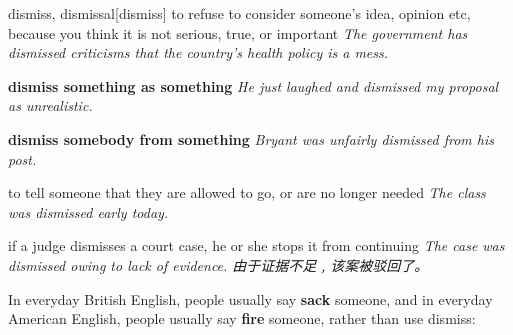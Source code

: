 \begin{DefWord}{dismiss, dismissal}[dismiss]
    to refuse to consider someone’s idea, opinion etc, because you think it is not serious, true, or important
    \textit{The government has dismissed criticisms that the country’s health policy is a mess.}

    \textbf{dismiss something as something}
    \textit{He just laughed and dismissed my proposal as unrealistic.}

    \textbf{dismiss somebody from something}
    \textit{ Bryant was unfairly dismissed from his post.}

    to tell someone that they are allowed to go, or are no longer needed
    \textit{The class was dismissed early today.}

    if a judge dismisses a court case, he or she stops it from continuing
    \textit{The case was dismissed owing to lack of evidence. 由于证据不足﹐该案被驳回了。}
\end{DefWord}

\begin{remark}
    In everyday British English, people usually say \textbf{sack} someone, and in everyday American English, people usually say \textbf{fire} someone, rather than use dismiss:
\end{remark}